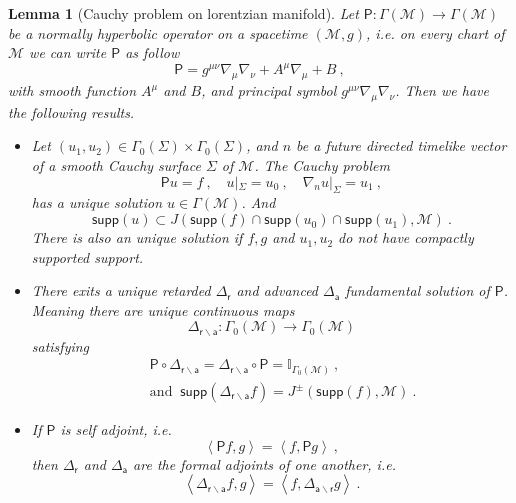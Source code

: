 \documentclass[10pt]{book}
\newcommand{\supp}{\mathsf{supp}}
\newcommand{\sm}[1]{\left\langle#1\right\rangle}
\newcommand{\Mcal}{\mathcal{M}}
\newcommand{\Ibb}{\mathbb{I}}
\newcommand{\Psf}{\mathsf{P}}
\newcommand{\asf}{\mathsf{a}}
\newcommand{\rsf}{\mathsf{r}}
\theoremstyle{break}
\newtheorem{lemma}{Lemma}
\begin{document}
\begin{lemma}[Cauchy problem on lorentzian manifold]\label{lem:cauchy_pb}
Let $\Psf : \Gamma(\Mcal) \to \Gamma(\Mcal)$ be a normally hyperbolic operator on a spacetime $(\Mcal,g)$, i.e. on every chart of $\Mcal$ we can write $\Psf$ as follow
%
\begin{equation*}
\Psf = g^{\mu\nu} \nabla_\mu \nabla_\nu + A^\mu \nabla_\mu + B \ ,
\end{equation*}
%
with smooth function $A^\mu$ and $B$, and principal symbol $g^{\mu\nu} \nabla_\mu \nabla_\nu$. Then we have the following results.
%
\begin{itemize}
\item Let $(u_1,u_2) \in \Gamma_0(\Sigma) \times \Gamma_0(\Sigma)$, and $n$ be a future directed timelike vector of a smooth Cauchy surface $\Sigma$ of $\Mcal$. The Cauchy problem
%
\begin{equation*}
\Psf u = f \ , \quad u|_\Sigma = u_0 \ , \quad \nabla_n u |_\Sigma = u_1 \ ,
\end{equation*}
%
has a unique solution $u \in \Gamma(\Mcal)$. And
%
\begin{equation*}
\supp(u) \subset J\left( \supp(f) \cap \supp(u_0) \cap \supp(u_1) , \Mcal \right) \ .
\end{equation*}
%
There is also an unique solution if $f, g$ and $u_1,u_2$ do not have compactly supported support.

\item There exits a unique retarded $\Delta_\rsf$ and advanced $\Delta_\asf$ fundamental solution of $\Psf$. Meaning there are unique continuous maps 
%
\begin{equation*}
\Delta_{\rsf\backslash\asf} : \Gamma_0(\Mcal) \to \Gamma_0(\Mcal)  
\end{equation*}
%
satisfying 
%
\begin{eqnarray*}
&& \Psf \circ \Delta_{\rsf\backslash\asf} = \Delta_{\rsf\backslash\asf} \circ \Psf = \Ibb_{\Gamma_0(\Mcal)} \ , \\
&& \mbox{and } \ \supp(\Delta_{\rsf\backslash\asf} f) = J^{\pm} \left(\supp(f) , \Mcal\right) \ .
\end{eqnarray*}

\item If $\Psf$ is self adjoint, i.e. 
%
\begin{equation*}
\sm{\Psf f,g} = \sm{f,\Psf g} \ ,
\end{equation*}
%
then $\Delta_\rsf$ and $\Delta_\asf$ are the formal adjoints of one another, i.e.
%
\begin{equation*}
\sm{\Delta_{\rsf\backslash\asf} f , g} = \sm{f , \Delta_{\asf\backslash\rsf} g} \ . 
\end{equation*}


\end{itemize}
\end{lemma}
\end{document}
